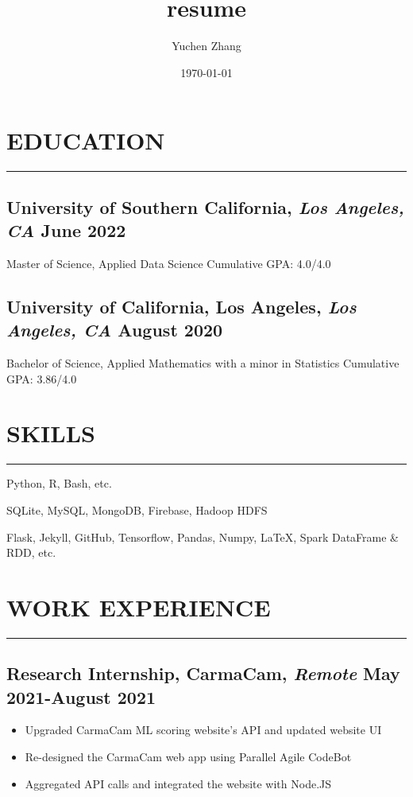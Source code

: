 \documentclass[12pt]{article}
\title{resume}
\author{Yuchen Zhang}
\date{\today}
\newcommand{\divider}{\vskip2pt{\color{black}\hrule}\vskip2pt}
\begin{document}
\section*{EDUCATION}
\divider
\subsection*{University of Southern California{\normalfont, \textit{Los Angeles, CA} \hfill June 2022}}
\noindent
Master of Science, Applied Data Science
\hfill
Cumulative GPA: 4.0/4.0

\vspace{0.1in}

\subsection*{University of California, Los Angeles{\normalfont, \textit{Los Angeles, CA} \hfill August 2020}}
\noindent
Bachelor of Science, Applied Mathematics with a minor in Statistics 
\hfill 
Cumulative GPA: 3.86/4.0

\vspace{0.1in}

\section*{SKILLS}
\divider
\vspace{3pt}
\begin{description}
    \setlength\itemsep{-1pt}
    \item[Programming Languages] Python, R, Bash, etc.
    \item[Database Management] SQLite, MySQL, MongoDB, Firebase, Hadoop HDFS
    \item[Tools] Flask, Jekyll, GitHub, Tensorflow, Pandas, Numpy, \LaTeX, 
        Spark DataFrame \& RDD, etc.
\end{description}

\section*{WORK EXPERIENCE}
\divider
\subsection*{Research Internship{\normalfont, CarmaCam, \textit{Remote} \hfill May 2021-August 2021}}
\begin{itemize}
    \setlength\itemsep{-1pt}
    \item Upgraded CarmaCam ML scoring website's API and updated website UI
    \item Re-designed the CarmaCam web app using Parallel Agile\textregistered\xspace CodeBot\textregistered
    \item Aggregated API calls and integrated the website with Node.JS
\end{itemize}
\end{document}
